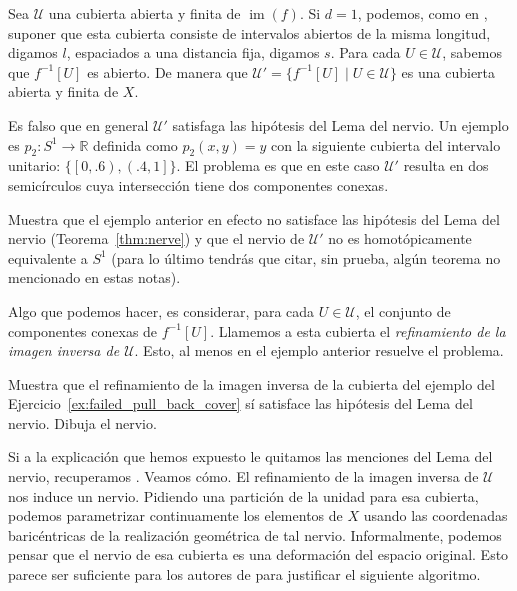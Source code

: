 \documentclass{standalone}
\begin{document}
	Sea $\mathcal{U}$ una cubierta abierta y finita de $\operatorname{im}(f)$. Si $d=1$, podemos, como en \cite{mapper}, suponer que esta cubierta consiste de intervalos abiertos de la misma longitud, digamos $l$, espaciados a una distancia fija, digamos $s$. Para cada $U\in\mathcal{U}$, sabemos que $f^{-1}[U]$ es abierto. De manera que $\mathcal{U}'= \{f^{-1}[U]\mid U\in\mathcal{U}\}$ es una cubierta abierta y finita de $X$.
	
	Es falso que en general $\mathcal{U}'$ satisfaga las hipótesis del Lema del nervio. Un ejemplo es $p_{2}\colon S^{1}\rightarrow \mathbb{R}$ definida como $p_{2}(x,y) =y$ con la siguiente cubierta del intervalo unitario: $\{\left[0,.6\right),\left(.4,1\right]\}$. El problema es que en este caso $\mathcal{U}'$ resulta en dos semicírculos cuya intersección tiene dos componentes conexas.
	
	\begin{exercise}\label{ex:failed_pull_back_cover}
		Muestra que el ejemplo anterior en efecto no satisface las hipótesis del Lema del nervio (Teorema~\ref{thm:nerve}) y que el nervio de $\mathcal{U}'$ no es homotópicamente equivalente a $S^{1}$ (para lo último tendrás que citar, sin prueba, algún teorema no mencionado en estas notas).
	\end{exercise}
	
	Algo que podemos hacer, es considerar, para cada $U\in\mathcal{U}$, el conjunto de componentes conexas de $f^{-1}[U]$. Llamemos a esta cubierta el \emph{refinamiento de la imagen inversa de $\mathcal{U}$}. Esto, al menos en el ejemplo anterior resuelve el problema. 
	
	\begin{exercise}
		Muestra que el refinamiento de la imagen inversa de la cubierta del ejemplo del Ejercicio~\ref{ex:failed_pull_back_cover} sí satisface las hipótesis del Lema del nervio. Dibuja el nervio.
	\end{exercise}
	
	Si a la explicación que hemos expuesto le quitamos las menciones del Lema del nervio, recuperamos \cite[Sección 2.1]{mapper}. Veamos cómo. El refinamiento de la imagen inversa de $\mathcal{U}$ nos induce un nervio. Pidiendo una partición de la unidad para esa cubierta, podemos parametrizar continuamente los elementos de $X$ usando las coordenadas baricéntricas de la realización geométrica de tal nervio. Informalmente, podemos pensar que el nervio de esa cubierta es una deformación del espacio original. Esto parece ser suficiente para los autores de \cite{mapper} para justificar el siguiente algoritmo.
	
\end{document}
